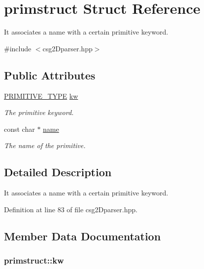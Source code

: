 \hypertarget{structprimstruct}{
\section{primstruct Struct Reference}
\label{structprimstruct}
}


It associates a name with a certain primitive keyword.  




{\ttfamily \#include $<$csg2Dparser.hpp$>$}

\subsection*{Public Attributes}
\begin{DoxyCompactItemize}
\item 
\hyperlink{csg2_dparser_8hpp_ab40fb89cc758bdfbf49d368eb0110f47}{PRIMITIVE\_\-TYPE} \hyperlink{structprimstruct_a0b5fa70a3b3084fa1ca8e18b0fe12681}{kw}
\begin{DoxyCompactList}\small\item\em The primitive keyword. \item\end{DoxyCompactList}\item 
const char $\ast$ \hyperlink{structprimstruct_afd12c5b018f006d9f864378a95f02143}{name}
\begin{DoxyCompactList}\small\item\em The name of the primitive. \item\end{DoxyCompactList}\end{DoxyCompactItemize}


\subsection{Detailed Description}
It associates a name with a certain primitive keyword. 

Definition at line 83 of file csg2Dparser.hpp.



\subsection{Member Data Documentation}
\hypertarget{structprimstruct_a0b5fa70a3b3084fa1ca8e18b0fe12681}{
\subsubsection[{kw}]{ {\bf primstruct::kw}}}
\label{structprimstruct_a0b5fa70a3b3084fa1ca8e18b0fe12681}



